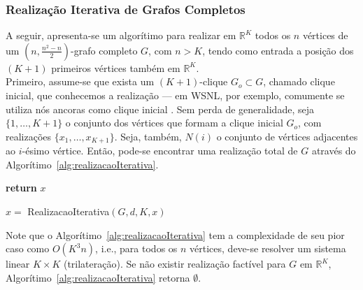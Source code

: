 \subsubsection{Realização Iterativa de Grafos Completos}

A seguir, apresenta-se um algorítimo para realizar em $\mathbb{R}^K$ todos os $n$ vértices de um $(n,\frac{n^2 -n}{2})$-grafo completo $G$, com $n > K$, tendo como entrada a posição dos $(K+1)$ primeiros vértices também em $\mathbb{R}^{K}$.
\\

Primeiro, assume-se que exista um $(K+1)$-clique $G_o \subset G$, chamado clique inicial, que conhecemos a realização --- em WSNL, por exemplo, comumente se utiliza nós ancoras como clique inicial \cite{eren2004rigidity, savvides2001dynamic}. Sem perda de generalidade, seja $\{1,\dots,K+1\}$ o conjunto dos vértices que formam a clique inicial $G_o$, com realizações $\{x_1, \dots,x_{K+1}\}$. Seja, também, $N(i)$ o conjunto de vértices adjacentes ao $i$-ésimo vértice. Então, pode-se encontrar uma realização total de $G$ através do Algorítimo~\ref{alg:realizacaoIterativa}. 
\\

\begin{algorithm}[H]
	\label{alg:realizacaoIterativa}
	\textbf{return} $x$\;
	\caption{$x =$ RealizacaoIterativa$(G,d, K, x)$ \cite{libertiEDG}}
\end{algorithm}
\vspace{0.5cm}
Note que o Algorítimo~\ref{alg:realizacaoIterativa} tem a complexidade de seu pior caso como $O(K^3n)$, i.e., para todos os $n$ vértices, deve-se resolver um sistema linear $K\times K$ (trilateração). Se não existir realização factível para $G$ em $\mathbb{R}^K$, Algorítimo~\ref{alg:realizacaoIterativa} retorna $\emptyset$.

